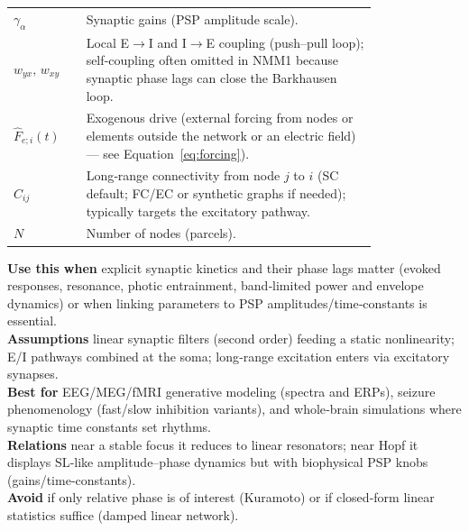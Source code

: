 \documentclass[12pt]{article}
\numberwithin{equation}{section}
\begin{document}
\begin{tcolorbox}
\begin{tabular}{@{}l p{0.8\linewidth}@{}}
\textbf{$\gamma_{\alpha}$} & Synaptic gains (PSP amplitude scale).\\
\textbf{$w_{yx},\,w_{xy}$} & Local E$\!\to$I and I$\!\to$E coupling (push–pull loop); self‑coupling often omitted in NMM1 because synaptic phase lags can close the Barkhausen loop.\\
\textbf{$\hat F_{e;i}(t)$}& Exogenous drive  (external forcing from nodes or elements outside the network or an electric field)--- see Equation~\ref{eq:forcing}).\\
\textbf{$C_{ij}$} & Long‑range connectivity from node $j$ to $i$ (SC default; FC/EC or synthetic graphs if needed); typically targets the excitatory pathway.\\
\textbf{$N$} & Number of nodes (parcels).\\
\end{tabular}
\end{tcolorbox}

\begin{tcolorbox}[
  colback=gray!5,
  colframe=slate,
  colbacktitle=softblue!25,
  coltitle=softblue!60!black,
  fonttitle=\bfseries\small,
  title={\small When to Use It},
  boxrule=0.4pt, enhanced, sharp corners,
  left=4pt,right=4pt,top=3pt,bottom=3pt,
  boxsep=2pt, before skip=6pt, after skip=6pt
]
\scriptsize
\textbf{Use this when} explicit synaptic kinetics and their phase lags matter (evoked responses, resonance, photic entrainment, band‑limited power and envelope dynamics) or when linking parameters to PSP amplitudes/time‑constants is essential.\\
\textbf{Assumptions} linear synaptic filters (second order) feeding a static nonlinearity; E/I pathways combined at the soma; long‑range excitation enters via excitatory synapses.\\
\textbf{Best for} EEG/MEG/fMRI generative modeling (spectra and ERPs), seizure phenomenology (fast/slow inhibition variants), and whole‑brain simulations where synaptic time constants set rhythms.\\
\textbf{Relations} near a stable focus it reduces to linear resonators; near Hopf it displays SL‑like amplitude–phase dynamics but with biophysical PSP knobs (gains/time‑constants).\\
\textbf{Avoid} if only relative phase is of interest (Kuramoto) or if closed‑form linear statistics suffice (damped linear network).
\end{tcolorbox}
\end{document}
